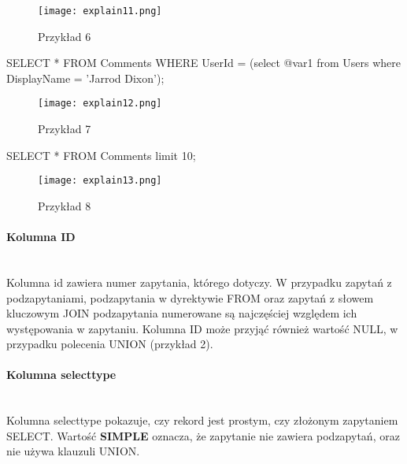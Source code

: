\begin{figure}[H]
	\texttt{[image: explain11.png]} 
	\caption{Przykład 6}
\end{figure}
\begin{spverbatim}
	SELECT * FROM Comments WHERE UserId = (select @var1 from Users where DisplayName = 'Jarrod Dixon');
\end{spverbatim}
\begin{figure}[H]
	\texttt{[image: explain12.png]} 
	\caption{Przykład 7}
\end{figure}
\begin{spverbatim}
SELECT * FROM Comments limit 10;
\end{spverbatim}
\begin{figure}[H]
	\texttt{[image: explain13.png]} 
	\caption{Przykład 8}
\end{figure}

\paragraph{Kolumna ID}\leavevmode\\
Kolumna id zawiera numer zapytania, którego dotyczy. W przypadku zapytań z podzapytaniami, podzapytania w dyrektywie FROM oraz zapytań z słowem kluczowym JOIN podzapytania numerowane są najczęściej względem ich występowania w zapytaniu. Kolumna ID może przyjąć również wartość NULL, w przypadku polecenia UNION (przykład 2).

\paragraph{Kolumna select\textunderscore type}\leavevmode\\
Kolumna select\textunderscore type pokazuje, czy rekord jest prostym, czy złożonym zapytaniem SELECT. 
Wartość \textbf{SIMPLE} oznacza, że zapytanie nie zawiera podzapytań, oraz nie używa klauzuli UNION.

